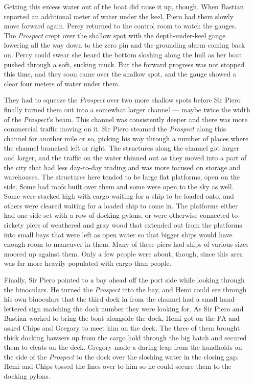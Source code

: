 \documentclass[
]{scrbook}
\begin{document}
Getting this excess water out of the boat did raise it up, though. When
Bastian reported an additional meter of water under the keel, Piero had
them slowly move forward again. Percy returned to the control room to
watch the gauges. The \emph{Prospect} crept over the shallow spot with
the depth-under-keel gauge lowering all the way down to the zero pin and
the grounding alarm coming back on. Percy could swear she heard the
bottom sloshing along the hull as her boat pushed through a soft,
sucking muck. But the forward progress was not stopped this time, and
they soon came over the shallow spot, and the gauge showed a clear four
meters of water under them.

\bigskip

They had to squeeze the \emph{Prospect} over two more shallow spots
before Sir Piero finally turned them out into a somewhat larger channel
--- maybe twice the width of the \emph{Prospect}'s beam. This channel
was consistently deeper and there was more commercial traffic moving on
it. Sir Piero steamed the \emph{Prospect} along this channel for another
mile or so, picking his way through a number of places where the channel
branched left or right. The structures along the channel got larger and
larger, and the traffic on the water thinned out as they moved into a
part of the city that had less day-to-day trading and was more focused
on storage and warehouses. The structures here tended to be large flat
platforms, open on the side. Some had roofs built over them and some
were open to the sky as well. Some were stacked high with cargo waiting
for a ship to be loaded onto, and others were cleared waiting for a
loaded ship to come in. The platforms either had one side set with a row
of docking pylons, or were otherwise connected to rickety piers of
weathered and gray wood that extended out from the platforms into small
bays that were left as open water so that bigger ships would have enough
room to maneuver in them. Many of these piers had ships of various sizes
moored up against them. Only a few people were about, though, since this
area was far more heavily populated with cargo than people.

Finally, Sir Piero pointed to a bay ahead off the port side while
looking through the binoculars. He turned the \emph{Prospect} into the
bay, and Hemi could see through his own binoculars that the third dock
in from the channel had a small hand-lettered sign matching the dock
number they were looking for. As Sir Piero and Bastian worked to bring
the boat alongside the dock, Hemi got on the PA and asked Chips and
Gregory to meet him on the deck. The three of them brought thick docking
hawsers up from the cargo hold through the big hatch and secured them to
cleats on the deck. Gregory made a daring leap from the handholds on the
side of the \emph{Prospect} to the dock over the sloshing water in the
closing gap. Hemi and Chips tossed the lines over to him so he could
secure them to the docking pylons.
\end{document}
